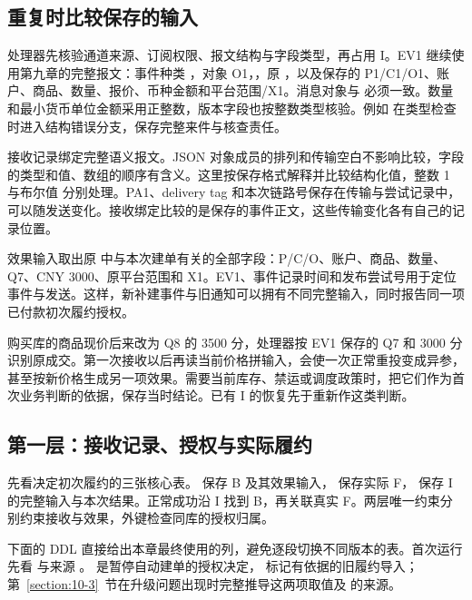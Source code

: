 \subsection*{重复时比较保存的输入}

处理器先核验通道来源、订阅权限、报文结构与字段类型，再占用 I。EV1 继续使用第九章的完整报文：事件种类 ，对象 O1，，原 ，以及保存的 P1/C1/O1、账户、商品、数量、报价、币种金额和平台范围/X1。消息对象与  必须一致。数量和最小货币单位金额采用正整数，版本字段也按整数类型核验。例如  在类型检查时进入结构错误分支，保存完整来件与核查责任。

接收记录绑定完整语义报文。JSON 对象成员的排列和传输空白不影响比较，字段的类型和值、数组的顺序有含义。这里按保存格式解释并比较结构化值，整数 1 与布尔值  分别处理。PA1、delivery tag 和本次链路号保存在传输与尝试记录中，可以随发送变化。接收绑定比较的是保存的事件正文，这些传输变化各有自己的记录位置。

效果输入取出原  中与本次建单有关的全部字段：P/C/O、账户、商品、数量、Q7、CNY 3000、原平台范围和 X1。EV1、事件记录时间和发布尝试号用于定位事件与发送。这样，新补建事件与旧通知可以拥有不同完整输入，同时报告同一项已付款初次履约授权。

购买库的商品现价后来改为 Q8 的 3500 分，处理器按 EV1 保存的 Q7 和 3000 分识别原成交。第一次接收以后再读当前价格拼输入，会使一次正常重投变成异参，甚至按新价格生成另一项效果。需要当前库存、禁运或调度政策时，把它们作为首次业务判断的依据，保存当时结论。已有 I 的恢复先于重新作这类判断。

\subsection*{第一层：接收记录、授权与实际履约}

先看决定初次履约的三张核心表。 保存 B 及其效果输入， 保存实际 F， 保存 I 的完整输入与本次结果。正常成功沿 I 找到 B，再关联真实 F。两层唯一约束分别约束接收与效果，外键检查同库的授权归属。

下面的 DDL 直接给出本章最终使用的列，避免逐段切换不同版本的表。首次运行先看  与来源 。 是暂停自动建单的授权决定， 标记有依据的旧履约导入；第~\ref{section:10-3}~节在升级问题出现时完整推导这两项取值及  的来源。

